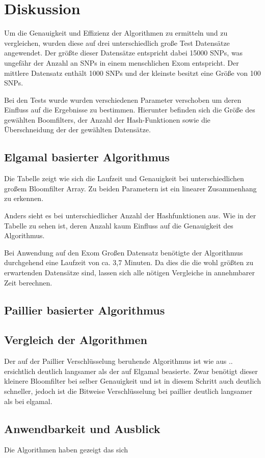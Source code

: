 \chapter{Diskussion}

Um die Genauigkeit und Effizienz der Algorithmen zu ermitteln und zu vergleichen, wurden diese auf drei unterschiedlich große Test Datensätze angewendet. 
Der größte dieser Datensätze entspricht dabei 15000 SNPs, was ungefähr der Anzahl an SNPs in einem menschlichen Exom entspricht.
Der mittlere Datensatz enthält 1000 SNPs und der kleinste besitzt eine Größe von 100 SNPs. 

Bei den Tests wurde wurden verschiedenen Parameter verschoben um deren Einfluss auf die Ergebnisse zu bestimmen.
Hierunter befinden sich die Größe des gewählten Boomfilters, der Anzahl der Hash-Funktionen sowie die Überschneidung der der gewählten Datensätze.

\section{Elgamal basierter Algorithmus}

Die Tabelle zeigt wie sich die Laufzeit und Genauigkeit bei unterschiedlichen großem Bloomfilter Array. 
Zu beiden Parametern ist ein linearer Zusammenhang zu erkennen.

Anders sieht es bei unterschiedlicher Anzahl der Hashfunktionen aus. 
Wie in der Tabelle zu sehen ist, deren Anzahl kaum Einfluss auf die Genauigkeit des Algorithmus.

Bei Anwendung auf den Exom Großen Datensatz benötigte der Algorithmus durchgehend eine Laufzeit von ca. 3,7 Minuten.
Da dies die die wohl größten zu erwartenden Datensätze sind, lassen sich alle nötigen Vergleiche in annehmbarer Zeit berechnen. 


\section{Paillier basierter Algorithmus}


\section{Vergleich der Algorithmen}

Der auf der Paillier Verschlüsselung beruhende Algorithmus ist wie aus .. ersichtlich deutlich langsamer als der auf Elgamal beasierte. Zwar benötigt dieser kleinere Bloomfilter bei selber Genauigkeit und ist in diesem Schritt auch deutlich schneller, jedoch ist die Bitweise Verschlüsselung bei paillier deutlich langsamer als bei elgamal.

\section{Anwendbarkeit und Ausblick}

Die Algorithmen haben gezeigt das sich 